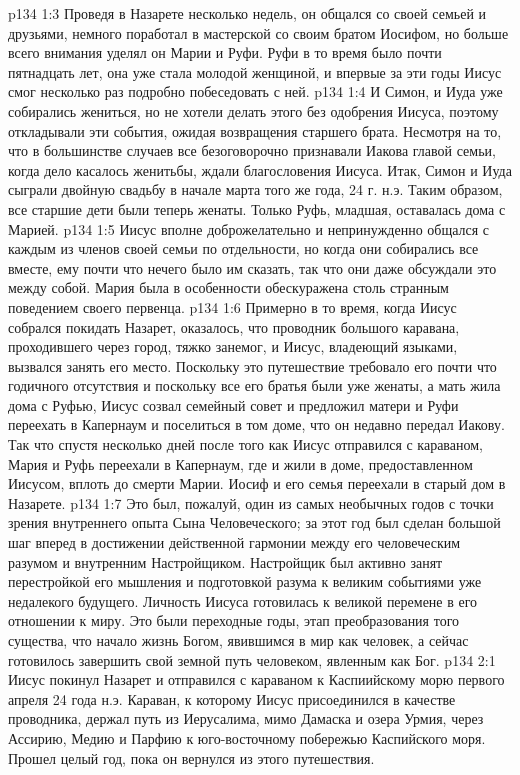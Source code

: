 \vs p134 1:3 Проведя в Назарете несколько недель, он общался со своей семьей и друзьями, немного поработал в мастерской со своим братом Иосифом, но больше всего внимания уделял он Марии и Руфи. Руфи в то время было почти пятнадцать лет, она уже стала молодой женщиной, и впервые за эти годы Иисус смог несколько раз подробно побеседовать с ней.
\vs p134 1:4 И Симон, и Иуда уже собирались жениться, но не хотели делать этого без одобрения Иисуса, поэтому откладывали эти события, ожидая возвращения старшего брата. Несмотря на то, что в большинстве случаев все безоговорочно признавали Иакова главой семьи, когда дело касалось женитьбы, ждали благословения Иисуса. Итак, Симон и Иуда сыграли двойную свадьбу в начале марта того же года, 24 г. н.э. Таким образом, все старшие дети были теперь женаты. Только Руфь, младшая, оставалась дома с Марией.
\vs p134 1:5 Иисус вполне доброжелательно и непринужденно общался с каждым из членов своей семьи по отдельности, но когда они собирались все вместе, ему почти что нечего было им сказать, так что они даже обсуждали это между собой. Мария была в особенности обескуражена столь странным поведением своего первенца.
\vs p134 1:6 Примерно в то время, когда Иисус собрался покидать Назарет, оказалось, что проводник большого каравана, проходившего через город, тяжко занемог, и Иисус, владеющий языками, вызвался занять его место. Поскольку это путешествие требовало его почти что годичного отсутствия и поскольку все его братья были уже женаты, а мать жила дома с Руфью, Иисус созвал семейный совет и предложил матери и Руфи переехать в Капернаум и поселиться в том доме, что он недавно передал Иакову. Так что спустя несколько дней после того как Иисус отправился с караваном, Мария и Руфь переехали в Капернаум, где и жили в доме, предоставленном Иисусом, вплоть до смерти Марии. Иосиф и его семья переехали в старый дом в Назарете.
\vs p134 1:7 Это был, пожалуй, один из самых необычных годов с точки зрения внутреннего опыта Сына Человеческого; за этот год был сделан большой шаг вперед в достижении действенной гармонии между его человеческим разумом и внутренним Настройщиком. Настройщик был активно занят перестройкой его мышления и подготовкой разума к великим событиями уже недалекого будущего. Личность Иисуса готовилась к великой перемене в его отношении к миру. Это были переходные годы, этап преобразования того существа, что начало жизнь Богом, явившимся в мир как человек, а сейчас готовилось завершить свой земной путь человеком, явленным как Бог.
\vs p134 2:1 Иисус покинул Назарет и отправился с караваном к Каспиийскому морю первого апреля 24 года н.э. Караван, к которому Иисус присоединился в качестве проводника, держал путь из Иерусалима, мимо Дамаска и озера Урмия, через Ассирию, Медию и Парфию к юго\hyp{}восточному побережью Каспийского моря. Прошел целый год, пока он вернулся из этого путешествия.
